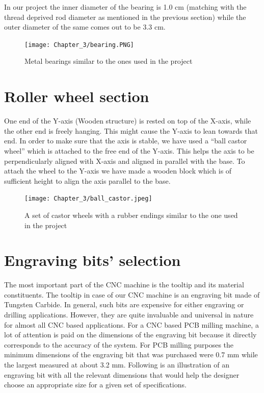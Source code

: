 In our project the inner diameter of the bearing is 1.0 cm (matching with the thread deprived rod diameter as mentioned in the previous section) while the outer diameter of the same comes out to be 3.3 cm. \pagebreak

\begin{figure}[h]
 \centering
 \texttt{[image: Chapter\_3/bearing.PNG]}
 \caption{Metal bearings similar to the ones used in the project}
 \label{fig:bearing}
\end{figure}

\section{Roller wheel section}

One end of the Y-axis (Wooden structure) is rested on top of the X-axis, while the other end is freely hanging. This might cause the Y-axis to lean towards that end. In order to make sure that the axis is stable, we have used a “ball castor wheel” which is attached to the free end of the Y-axis. This helps the axis to be perpendicularly aligned with X-axis and aligned in parallel with the base. To attach the wheel to the Y-axis we have made a wooden block which is of sufficient height to align the axis parallel to the base.

\begin{figure}[h]
 \centering
 \texttt{[image: Chapter\_3/ball\_castor.jpeg]}
 \caption{A set of castor wheels with a rubber endings similar to the one used in the project}
 \label{fig:ballcastor}
\end{figure}

\section{Engraving bits' selection}

The most important part of the CNC machine is the tooltip and its material constituents. The tooltip in case of our CNC machine is an engraving bit made of Tungsten Carbide. In general, such bits are expensive for either engraving or drilling applications. However, they are quite invaluable and universal in nature for almost all CNC based applications. For a CNC based PCB milling machine, a lot of attention is paid on the dimensions of the engraving bit because it directly corresponds to the accuracy of the system. For PCB milling purposes the minimum dimensions of the engraving bit that was purchased were 0.7 mm while the largest measured at about 3.2 mm. Following is an illustration of an engraving bit with all the relevant dimensions that would help the designer choose an appropriate size for a given set of specifications.

